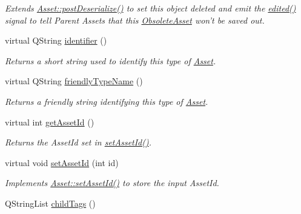 \begin{DoxyCompactItemize}
\begin{DoxyCompactList}\small\item\em Extends \hyperlink{class_picto_1_1_asset_a40a6b15b05855f8cb392e29d31d80914}{Asset\-::post\-Deserialize()} to set this object deleted and emit the \hyperlink{class_picto_1_1_asset_a2ca6303bf64730a9994a180bf2227da4}{edited()} signal to tell Parent Assets that this \hyperlink{class_picto_1_1_obsolete_asset}{Obsolete\-Asset} won't be saved out. \end{DoxyCompactList}\item 
virtual Q\-String \hyperlink{class_picto_1_1_obsolete_asset_a8cc99b68a745a111472a3ae1bf3f1112}{identifier} ()
\begin{DoxyCompactList}\small\item\em Returns a short string used to identify this type of \hyperlink{class_picto_1_1_asset}{Asset}. \end{DoxyCompactList}\item 
virtual Q\-String \hyperlink{class_picto_1_1_obsolete_asset_af9d35c6a769cca86ed56a8bab7f8a735}{friendly\-Type\-Name} ()
\begin{DoxyCompactList}\small\item\em Returns a friendly string identifying this type of \hyperlink{class_picto_1_1_asset}{Asset}. \end{DoxyCompactList}\item 
\hypertarget{class_picto_1_1_obsolete_asset_ae7d9e033b20f1e1bd8e6ae297c73a58c}{virtual int \hyperlink{class_picto_1_1_obsolete_asset_ae7d9e033b20f1e1bd8e6ae297c73a58c}{get\-Asset\-Id} ()}\label{class_picto_1_1_obsolete_asset_ae7d9e033b20f1e1bd8e6ae297c73a58c}

\begin{DoxyCompactList}\small\item\em Returns the Asset\-Id set in \hyperlink{class_picto_1_1_obsolete_asset_a839526979e9024e1858cb881ebef743e}{set\-Asset\-Id()}. \end{DoxyCompactList}\item 
\hypertarget{class_picto_1_1_obsolete_asset_a839526979e9024e1858cb881ebef743e}{virtual void \hyperlink{class_picto_1_1_obsolete_asset_a839526979e9024e1858cb881ebef743e}{set\-Asset\-Id} (int id)}\label{class_picto_1_1_obsolete_asset_a839526979e9024e1858cb881ebef743e}

\begin{DoxyCompactList}\small\item\em Implements \hyperlink{class_picto_1_1_asset_a75ac07afb24b70da4885caef07855953}{Asset\-::set\-Asset\-Id()} to store the input Asset\-Id. \end{DoxyCompactList}\item 
\hypertarget{class_picto_1_1_obsolete_asset_a11f8720400db2870ccea922a71a73cd2}{Q\-String\-List \hyperlink{class_picto_1_1_obsolete_asset_a11f8720400db2870ccea922a71a73cd2}{child\-Tags} ()}\label{class_picto_1_1_obsolete_asset_a11f8720400db2870ccea922a71a73cd2}


\end{DoxyCompactItemize}
